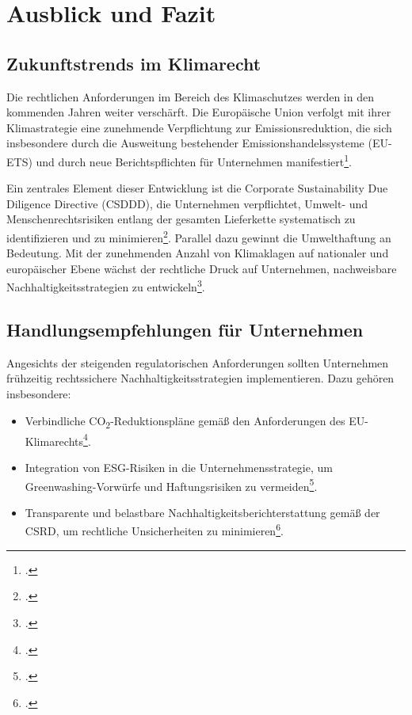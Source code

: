 \section{Ausblick und Fazit}

\subsection{Zukunftstrends im Klimarecht}

Die rechtlichen Anforderungen im Bereich des Klimaschutzes werden in den kommenden Jahren weiter verschärft. Die Europäische Union verfolgt mit ihrer Klimastrategie eine zunehmende Verpflichtung zur Emissionsreduktion, die sich insbesondere durch die Ausweitung bestehender Emissionshandelssysteme (EU-ETS) und durch neue Berichtspflichten für Unternehmen manifestiert\footcite[]{eu_klimapolitik}.  

Ein zentrales Element dieser Entwicklung ist die Corporate Sustainability Due Diligence Directive (CSDDD), die Unternehmen verpflichtet, Umwelt- und Menschenrechtsrisiken entlang der gesamten Lieferkette systematisch zu identifizieren und zu minimieren\footcite[]{eu_csddd}.  
%
Parallel dazu gewinnt die Umwelthaftung an Bedeutung. Mit der zunehmenden Anzahl von Klimaklagen auf nationaler und europäischer Ebene wächst der rechtliche Druck auf Unternehmen, nachweisbare Nachhaltigkeitsstrategien zu entwickeln\footcite[]{eu_umwelthaftung}.  
%
\subsection{Handlungsempfehlungen für Unternehmen}

Angesichts der steigenden regulatorischen Anforderungen sollten Unternehmen frühzeitig rechtssichere Nachhaltigkeitsstrategien implementieren. Dazu gehören insbesondere:
\begin{itemize}
	\item Verbindliche CO\textsubscript{2}-Reduktionspläne gemäß den Anforderungen des EU-Klimarechts\footcite[]{eu_klimapolitik}.
	\item Integration von ESG-Risiken in die Unternehmensstrategie, um Greenwashing-Vorwürfe und Haftungsrisiken zu vermeiden\footcite[]{bafin_nachhaltigkeit}.
	\item Transparente und belastbare Nachhaltigkeitsberichterstattung gemäß der \gls{CSRD}, um rechtliche Unsicherheiten zu minimieren\footcite[]{eu_csrd}.
\end{itemize}

